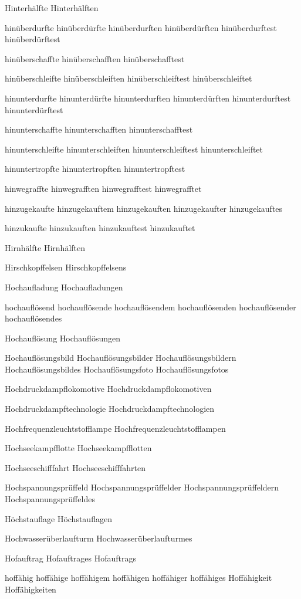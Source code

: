 Hinterhälfte
Hinterhälften

hinüberdurfte
hinüberdürfte
hinüberdurften
hinüberdürften
hinüberdurftest
hinüberdürftest

hinüberschaffte
hinüberschafften
hinüberschafftest

hinüberschleifte
hinüberschleiften
hinüberschleiftest
hinüberschleiftet

hinunterdurfte
hinunterdürfte
hinunterdurften
hinunterdürften
hinunterdurftest
hinunterdürftest

hinunterschaffte
hinunterschafften
hinunterschafftest

hinunterschleifte
hinunterschleiften
hinunterschleiftest
hinunterschleiftet

hinuntertropfte
hinuntertropften
hinuntertropftest

hinwegraffte
hinwegrafften
hinwegrafftest
hinwegrafftet

hinzugekaufte
hinzugekauftem
hinzugekauften
hinzugekaufter
hinzugekauftes

hinzukaufte
hinzukauften
hinzukauftest
hinzukauftet

Hirnhälfte
Hirnhälften

Hirschkopffelsen
Hirschkopffelsens

Hochaufladung
Hochaufladungen

hochauflösend
hochauflösende
hochauflösendem
hochauflösenden
hochauflösender
hochauflösendes

Hochauflösung
Hochauflösungen

Hochauflösungsbild
Hochauflösungsbilder
Hochauflösungsbildern
Hochauflösungsbildes
Hochauflösungsfoto
Hochauflösungsfotos

Hochdruckdampflokomotive
Hochdruckdampflokomotiven

Hochdruckdampftechnologie
Hochdruckdampftechnologien

Hochfrequenzleuchtstofflampe
Hochfrequenzleuchtstofflampen

Hochseekampfflotte
Hochseekampfflotten

Hochseeschifffahrt
Hochseeschifffahrten

Hochspannungsprüffeld
Hochspannungsprüffelder
Hochspannungsprüffeldern
Hochspannungsprüffeldes

Höchstauflage
Höchstauflagen

Hochwasserüberlaufturm
Hochwasserüberlaufturmes

Hofauftrag
Hofauftrages
Hofauftrags

hoffähig
hoffähige
hoffähigem
hoffähigen
hoffähiger
hoffähiges
Hoffähigkeit
Hoffähigkeiten


